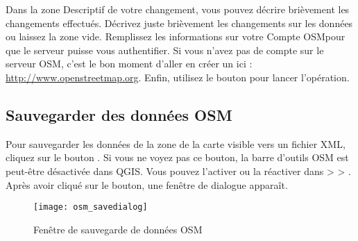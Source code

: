 Dans la zone \og Descriptif de votre changement\fg, vous pouvez décrire brièvement les changements effectués. Décrivez juste brièvement les changements sur les données ou laissez la zone vide.
Remplissez les informations sur votre \og Compte OSM\fg pour que le serveur puisse vous authentifier. Si vous n'avez pas de compte sur le serveur OSM, c'est le bon moment d'aller en créer un ici : \url{http://www.openstreetmap.org}. Enfin, utilisez le bouton  pour lancer l'opération.

\subsection{Sauvegarder des données OSM}  

Pour sauvegarder les données de la zone de la carte visible vers un fichier XML, cliquez sur le bouton . Si vous ne voyez pas ce bouton, la barre d'outils OSM est peut-être désactivée dans QGIS. Vous pouvez l'activer ou la réactiver dans  >  > . Après avoir cliqué sur le bouton, une fenêtre de dialogue apparaît.

\begin{figure}[ht]
   \centering
   \texttt{[image: osm\_savedialog]}   
   \caption{Fenêtre de sauvegarde de données OSM \nixcaption}\label{fig:osmsave}
\end{figure}

